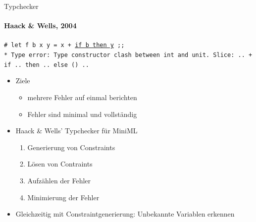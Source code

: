 \documentclass{beamer}
\begin{document}
\begin{frame}{Typchecker}
  \framesubtitle{Haack \& Wells, 2004}
    \texttt{\# let f b x y = x + \underline{if b then y} ;;\\
   * Type error: Type constructor clash between int and unit.
   Slice: .. + if .. then .. else () ..}
  \begin{itemize}
    \item Ziele
      \begin{itemize}
        \item mehrere Fehler auf einmal berichten
        \item Fehler sind minimal und vollständig
      \end{itemize}
    \item Haack \& Wells' Typchecker für MiniML
      \begin{enumerate}
        \item Generierung von Constraints
        \item Lösen von Contraints
        \item Aufzählen der Fehler
        \item Minimierung der Fehler
      \end{enumerate}
    \item Gleichzeitig mit Constraintgenerierung: Unbekannte Variablen erkennen
  \end{itemize}
\end{frame}
\end{document}
